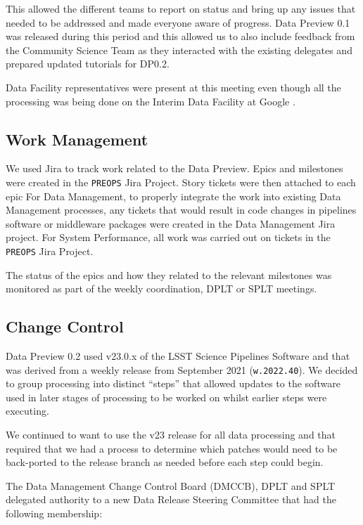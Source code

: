 This allowed the different teams to report on status and bring up any issues that needed to be addressed and made everyone aware of progress.
Data Preview 0.1 was released during this period and this allowed us to also include feedback from the Community Science Team as they interacted with the existing delegates and prepared updated tutorials for DP0.2.

Data Facility representatives were present at this meeting even though all the processing was being done on the Interim Data Facility at Google \citep{2021arXiv211115030O}.

\subsection{Work Management}

We used Jira to track work related to the Data Preview.
Epics and milestones were created in the \texttt{PREOPS} Jira Project.
Story tickets were then attached to each epic 
For Data Management, to properly integrate the work into existing Data Management processes, any tickets that would result in code changes in pipelines software or middleware packages were created in the Data Management Jira project.
For System Performance, all work was carried out on tickets in the  \texttt{PREOPS} Jira Project.

The status of the epics and how they related to the relevant milestones was monitored as part of the weekly coordination, DPLT or SPLT meetings.

\subsection{Change Control}

Data Preview 0.2 used v23.0.x of the LSST Science Pipelines Software and that was derived from a weekly release from September 2021 (\texttt{w.2022.40}).
We decided to group processing into distinct ``steps'' that allowed updates to the software used in later stages of processing to be worked on whilst earlier steps were executing.

We continued to want to use the v23 release for all data processing and that required that we had a process to determine which patches would need to be back-ported to the release branch as needed before each step could begin.

The Data Management Change Control Board (DMCCB), DPLT and SPLT  delegated authority to a new Data Release Steering Committee that had the following membership:


